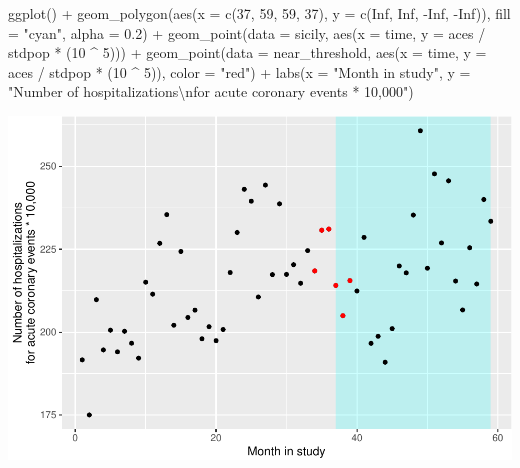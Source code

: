 \documentclass[
]{book}
\newenvironment{Shaded}{\begin{snugshade}}{\end{snugshade}}
\newcommand{\AttributeTok}[1]{\textcolor[rgb]{0.77,0.63,0.00}{#1}}
\newcommand{\ConstantTok}[1]{\textcolor[rgb]{0.00,0.00,0.00}{#1}}
\newcommand{\DecValTok}[1]{\textcolor[rgb]{0.00,0.00,0.81}{#1}}
\newcommand{\FloatTok}[1]{\textcolor[rgb]{0.00,0.00,0.81}{#1}}
\newcommand{\FunctionTok}[1]{\textcolor[rgb]{0.00,0.00,0.00}{#1}}
\newcommand{\NormalTok}[1]{#1}
\newcommand{\SpecialCharTok}[1]{\textcolor[rgb]{0.00,0.00,0.00}{#1}}
\newcommand{\StringTok}[1]{\textcolor[rgb]{0.31,0.60,0.02}{#1}}
\begin{document}
\begin{Shaded}
\begin{Highlighting}[]
\FunctionTok{ggplot}\NormalTok{() }\SpecialCharTok{+} 
  \FunctionTok{geom\_polygon}\NormalTok{(}\FunctionTok{aes}\NormalTok{(}\AttributeTok{x =} \FunctionTok{c}\NormalTok{(}\DecValTok{37}\NormalTok{, }\DecValTok{59}\NormalTok{, }\DecValTok{59}\NormalTok{, }\DecValTok{37}\NormalTok{), }
                   \AttributeTok{y =} \FunctionTok{c}\NormalTok{(}\ConstantTok{Inf}\NormalTok{, }\ConstantTok{Inf}\NormalTok{, }\SpecialCharTok{{-}}\ConstantTok{Inf}\NormalTok{, }\SpecialCharTok{{-}}\ConstantTok{Inf}\NormalTok{)), }
               \AttributeTok{fill =} \StringTok{"cyan"}\NormalTok{, }\AttributeTok{alpha =} \FloatTok{0.2}\NormalTok{) }\SpecialCharTok{+} 
  \FunctionTok{geom\_point}\NormalTok{(}\AttributeTok{data =}\NormalTok{ sicily, }\FunctionTok{aes}\NormalTok{(}\AttributeTok{x =}\NormalTok{ time, }\AttributeTok{y =}\NormalTok{ aces }\SpecialCharTok{/}\NormalTok{ stdpop }\SpecialCharTok{*}\NormalTok{ (}\DecValTok{10} \SpecialCharTok{\^{}} \DecValTok{5}\NormalTok{))) }\SpecialCharTok{+} 
  \FunctionTok{geom\_point}\NormalTok{(}\AttributeTok{data =}\NormalTok{ near\_threshold, }
             \FunctionTok{aes}\NormalTok{(}\AttributeTok{x =}\NormalTok{ time, }\AttributeTok{y =}\NormalTok{ aces }\SpecialCharTok{/}\NormalTok{ stdpop }\SpecialCharTok{*}\NormalTok{ (}\DecValTok{10} \SpecialCharTok{\^{}} \DecValTok{5}\NormalTok{)), }
             \AttributeTok{color =} \StringTok{"red"}\NormalTok{) }\SpecialCharTok{+} 
  \FunctionTok{labs}\NormalTok{(}\AttributeTok{x =} \StringTok{"Month in study"}\NormalTok{, }
       \AttributeTok{y =} \StringTok{"Number of hospitalizations}\SpecialCharTok{\textbackslash{}n}\StringTok{for acute coronary events * 10,000"}\NormalTok{)}
\end{Highlighting}
\end{Shaded}

\includegraphics{adv_epi_analysis_files/figure-latex/unnamed-chunk-127-1.pdf}
\end{document}
